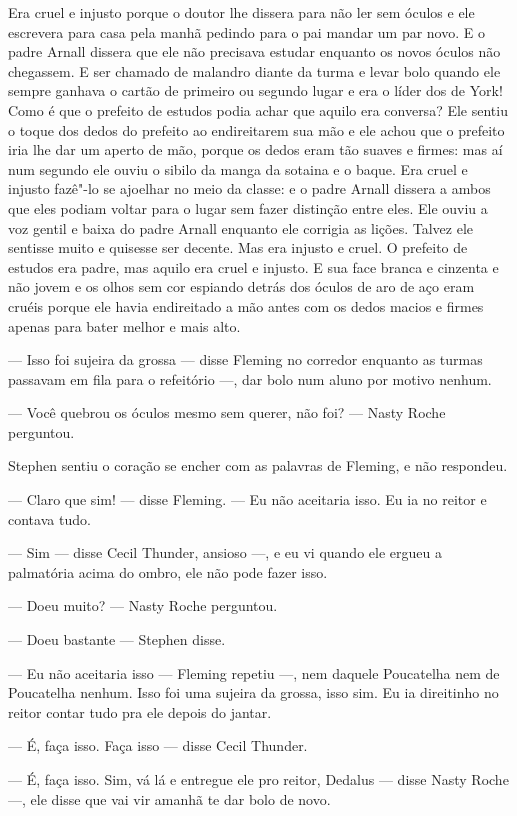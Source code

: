 Era cruel e injusto porque o doutor lhe dissera para não ler sem óculos
e ele escrevera para casa pela manhã pedindo para o pai mandar um par
novo. E o padre Arnall dissera que ele não precisava estudar enquanto
os novos óculos não chegassem. E ser chamado de malandro diante da
turma e levar bolo quando ele sempre ganhava o cartão de primeiro ou
segundo lugar e era o líder dos de York! Como é que o prefeito de
estudos podia achar que aquilo era conversa? Ele sentiu o toque dos
dedos do prefeito ao endireitarem sua mão e ele achou que o prefeito
iria lhe dar um aperto de mão, porque os dedos eram tão suaves e
firmes: mas aí num segundo ele ouviu o sibilo da manga da sotaina e o
baque. Era cruel e injusto fazê"-lo se ajoelhar no meio da classe: e o
padre Arnall dissera a ambos que eles podiam voltar para o lugar sem
fazer distinção entre eles. Ele ouviu a voz gentil e baixa do padre
Arnall enquanto ele corrigia as lições. Talvez ele sentisse muito e
quisesse ser decente. Mas era injusto e cruel. O prefeito de estudos
era padre, mas aquilo era cruel e injusto. E sua face branca e cinzenta
e não jovem e os olhos sem cor espiando detrás dos óculos de aro de aço
eram cruéis porque ele havia endireitado a mão antes com os dedos
macios e firmes apenas para bater melhor e mais alto.

 --- Isso foi sujeira da grossa --- disse Fleming no corredor enquanto as
turmas passavam em fila para o refeitório ---, dar bolo num aluno por
motivo nenhum.

 --- Você quebrou os óculos mesmo sem querer, não foi? --- Nasty Roche
perguntou.

Stephen sentiu o coração se encher com as palavras de Fleming, e não
respondeu.

 --- Claro que sim! --- disse Fleming. --- Eu não aceitaria isso. Eu ia no reitor
e contava tudo.

 --- Sim --- disse Cecil Thunder, ansioso ---, e eu vi quando ele ergueu a
palmatória acima do ombro, ele não pode fazer isso.

 --- Doeu muito? --- Nasty Roche perguntou.

 --- Doeu bastante --- Stephen disse.

 --- Eu não aceitaria isso --- Fleming repetiu ---, nem daquele Poucatelha nem de
Poucatelha nenhum. Isso foi uma sujeira da grossa, isso sim. Eu
ia direitinho no reitor contar tudo pra ele depois do jantar.

 --- É, faça isso. Faça isso --- disse Cecil Thunder.

 --- É, faça isso. Sim, vá lá e entregue ele pro reitor, Dedalus --- disse
Nasty Roche ---, ele disse que vai vir amanhã te dar bolo de novo.

